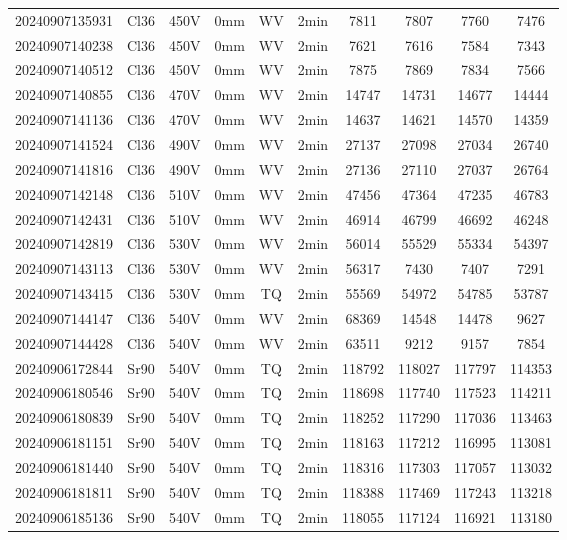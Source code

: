 \begin{center}
{\begin{longtable}{c c c c c c c c c c}
    20240907135931 & Cl36 & 450V & 0mm & WV & 2min & 7811 & 7807 & 7760 & 7476 \\
    20240907140238 & Cl36 & 450V & 0mm & WV & 2min & 7621 & 7616 & 7584 & 7343 \\
    20240907140512 & Cl36 & 450V & 0mm & WV & 2min & 7875 & 7869 & 7834 & 7566 \\
    20240907140855 & Cl36 & 470V & 0mm & WV & 2min & 14747 & 14731 & 14677 & 14444 \\
    20240907141136 & Cl36 & 470V & 0mm & WV & 2min & 14637 & 14621 & 14570 & 14359 \\
    20240907141524 & Cl36 & 490V & 0mm & WV & 2min & 27137 & 27098 & 27034 & 26740 \\
    20240907141816 & Cl36 & 490V & 0mm & WV & 2min & 27136 & 27110 & 27037 & 26764 \\
    20240907142148 & Cl36 & 510V & 0mm & WV & 2min & 47456 & 47364 & 47235 & 46783 \\
    20240907142431 & Cl36 & 510V & 0mm & WV & 2min & 46914 & 46799 & 46692 & 46248 \\
    20240907142819 & Cl36 & 530V & 0mm & WV & 2min & 56014 & 55529 & 55334 & 54397 \\
    20240907143113 & Cl36 & 530V & 0mm & WV & 2min & 56317 & 7430 & 7407 & 7291 \\
    20240907143415 & Cl36 & 530V & 0mm & TQ & 2min & 55569 & 54972 & 54785 & 53787 \\
    20240907144147 & Cl36 & 540V & 0mm & WV & 2min & 68369 & 14548 & 14478 & 9627 \\
    20240907144428 & Cl36 & 540V & 0mm & WV & 2min & 63511 & 9212 & 9157 & 7854 \\
    \midrule
    20240906172844 & Sr90 & 540V & 0mm & TQ & 2min & 118792 & 118027 & 117797 & 114353 \\ 
    20240906180546 & Sr90 & 540V & 0mm & TQ & 2min & 118698 & 117740 & 117523 & 114211 \\
    20240906180839 & Sr90 & 540V & 0mm & TQ & 2min & 118252 & 117290 & 117036 & 113463 \\
    20240906181151 & Sr90 & 540V & 0mm & TQ & 2min & 118163 & 117212 & 116995 & 113081 \\
    20240906181440 & Sr90 & 540V & 0mm & TQ & 2min & 118316 & 117303 & 117057 & 113032 \\
    20240906181811 & Sr90 & 540V & 0mm & TQ & 2min & 118388 & 117469 & 117243 & 113218 \\
    20240906185136 & Sr90 & 540V & 0mm & TQ & 2min & 118055 & 117124 & 116921 & 113180 \\

\end{longtable}}
\end{center}
